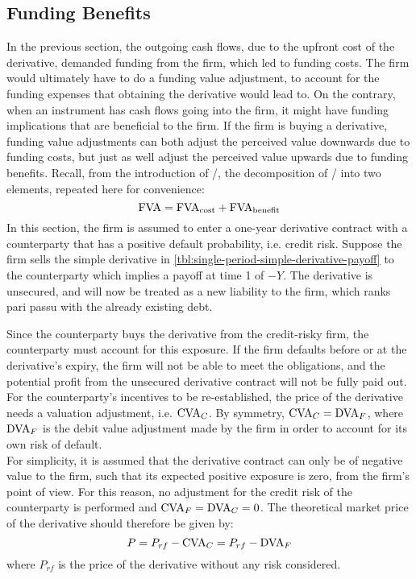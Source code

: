 \documentclass[../main.tex]{subfiles}
\begin{document}
    \subsection{Funding Benefits}
    \label{sec:example-funding-benefit}
        In the previous section, 
        the outgoing cash flows, due to the upfront cost of the derivative,
        demanded funding from the firm, which led to funding costs. 
        The firm would ultimately have to do a funding value adjustment,
        to account for the funding expenses that obtaining the derivative would lead to.
        On the contrary, when an instrument has cash flows going into the firm,
        it might have funding implications that are beneficial to the firm.
        If the firm is buying a derivative,
        funding value adjustments can both adjust the perceived value downwards due to funding costs,
        but just as well adjust the perceived value upwards due to funding benefits.
        Recall, from the introduction of \FVA/, the decomposition of \FVA/ into two elements,
        repeated here for convenience:
        \begin{equation}
            \FVA/ = \FCA/ + \FBA/
        \end{equation}
        In this section, the firm is assumed to enter a one-year derivative contract 
        with a counterparty that has a positive default probability, i.e. credit risk.
        Suppose the firm sells the simple derivative in \cref{tbl:single-period-simple-derivative-payoff} to the counterparty which implies a payoff at time 1 of $-Y$.
        The derivative is unsecured, and will now be treated as a new liability to the firm, 
        which ranks pari passu with the already existing debt.

        Since the counterparty buys the derivative from the credit-risky firm, 
        the counterparty must account for this exposure. 
        If the firm defaults before or at the derivative's expiry, the firm will not be able to meet the obligations, 
        and the potential profit from the unsecured derivative contract will not be fully paid out. 
        For the counterparty's incentives to be re-established, 
        the price of the derivative needs a valuation adjustment, i.e. $\CVA/_C$. 
        By symmetry, $\CVA/_C = \DVA/_F$, 
        where $\DVA/_F$ is the debit value adjustment made by the firm 
        in order to account for its own risk of default.\\
        For simplicity, it is assumed that the derivative contract 
        can only be of negative value to the firm, 
        such that its expected positive exposure is zero, from the firm's point of view.
        For this reason, no adjustment for the credit risk of the counterparty is performed and 
        $\CVA/_F = \DVA/_C = 0$.
        The theoretical market price of the derivative should therefore be given by:
        \begin{equation}\label{eqn:option-value-credit-risk}
            P = P_{rf} - \CVA/_C = P_{rf} - \DVA/_F
        \end{equation}
        where $P_{rf}$ is the price of the derivative without any risk considered.
\end{document}

